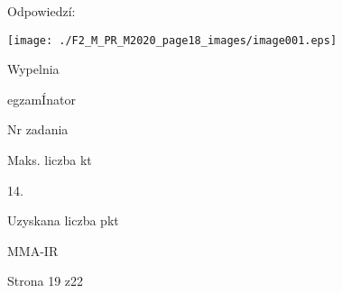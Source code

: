 \documentclass[a4paper,12pt]{article}
\begin{document}
Odpowiedzí:
\begin{center}
\texttt{[image: ./F2\_M\_PR\_M2020\_page18\_images/image001.eps]}
\end{center}
Wypelnia

egzamÍnator

Nr zadania

Maks. liczba kt

14.

Uzyskana liczba pkt

MMA-IR

Strona 19 z22
\end{document}
